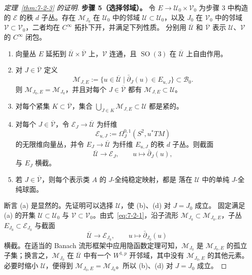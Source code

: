 \begin{proof}[定理~\ref{thm:7-2-3} 的证明]
\medskip
\noindent\textbf{步骤 5（选择邻域）。}\quad
令 $E\to\mathcal U_0\times\mathcal V_0$ 为步骤 3 中构造的
$\mathcal E$ 的秩 $d$ 子丛。存在 $\mathcal M_{J_0}$ 在 $\mathcal U_0$ 中的邻域
$\mathcal U\subset\mathcal U_0$，以及 $J_0$ 在 $\mathcal V_0$ 中的邻域
$\mathcal V\subset\mathcal V_0$，二者均在 $C^\infty$ 拓扑下开，并满足下列性质。
分别用 $\overline{\mathcal U}$ 和 $\overline{\mathcal V}$ 表示
$\mathcal U$、$\mathcal V$ 的 $C^\infty$ 闭包。
\begin{enumerate}[label=(\alph*),leftmargin=3em]
\item 向量丛 $E$ 延拓到
$\overline{\mathcal U}\times\overline{\mathcal V}$ 上，$\mathcal V$ 连通，且
$\operatorname{SO}(3)$ 在 $\overline{\mathcal U}$ 上自由作用。
\item 对 $J\in\overline{\mathcal V}$ 定义
\begin{equation}\label{eq:7-2-8}
  \mathcal M_{J,E}:=
  \bigl\{u\in\overline{\mathcal U}\mid
  \bar\partial_J(u)\in E_{u,J}\bigr\}\subset\mathcal B_0.
\end{equation}
则 $\mathcal M_{J_0,E}=\mathcal M_{J_0}$，并且对每个
$J\in\overline{\mathcal V}$ 都有 $\mathcal M_{J,E}\subset\mathcal U$。
\item 对每个紧集 $K\subset\overline{\mathcal V}$，集合
$\bigcup_{J\in K}\mathcal M_{J,E}\subset\mathcal U$ 都是紧的。
\item 对每个 $J\in\overline{\mathcal V}$，令
$\mathcal E_J\to\overline{\mathcal U}$ 为纤维
\[
  \mathcal E_{u,J}:=\Omega_J^{0,1}(S^2,u^*TM)
\]
的无限维向量丛，并令 $E_J\to\overline{\mathcal U}$ 为纤维 $E_{u,J}$ 的秩 $d$
子丛。则截面
\[
  \overline{\mathcal U}\longrightarrow\mathcal E_J,
  \qquad u\longmapsto\bar\partial_J(u),
\]
与 $E_J$ 横截。
\item 若 $J\in\overline{\mathcal V}$，则每个表示类 $A$ 的 $J$-全纯稳定映射，都是
落在 $\mathcal U$ 中的单纯 $J$-全纯球面。
\end{enumerate}

断言 (a) 是显然的。先证明可以选择 $\mathcal U$，使 (b)、(d) 对 $J=J_0$ 成立。
固定满足 (a) 的开集 $\mathcal U\subset\mathcal U_0$ 与
$\mathcal V\subset\mathcal V_0$。由式~\eqref{eq:7-2-1}，沿子流形
$\mathcal M_{J_0}\subset\mathcal M_{J_0,E}$，子丛
$E_{J_0}\subset\mathcal E_{J_0}$ 与截面
\[
  \overline{\mathcal U}\longrightarrow\mathcal E_{J_0},
  \qquad u\longmapsto\bar\partial_{J_0}(u)
\]
横截。在适当的 Banach 流形框架中应用隐函数定理可知，$\mathcal M_{J_0}$ 是
$\mathcal M_{J_0,E}$ 的孤立子集；换言之，$\mathcal M_{J_0}$ 在
$\overline{\mathcal U}$ 中有一个 $W^{1,p}$ 开邻域，其中没有
$\mathcal M_{J_0,E}$ 的其他元素。必要时缩小 $\mathcal U$，便得到
$\mathcal M_{J_0,E}=\mathcal M_{J_0}$。所以 (b)、(d) 对 $J=J_0$ 成立。


\end{proof}
